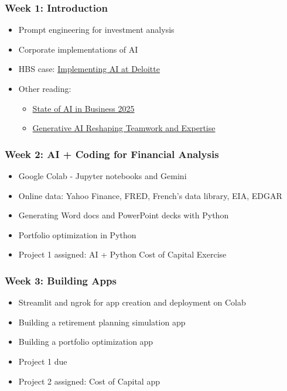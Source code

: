 \documentclass[11pt]{article}
\begin{document}
\subsubsection*{Week 1: Introduction}
\begin{itemize}\setlength{\itemsep}{0pt}
\item Prompt engineering for investment analysis
\item Corporate implementations of AI
\item HBS case: \href{https://hbsp.harvard.edu/product/HEC382-PDF-ENG}{Implementing AI at Deloitte}
\item Other reading: 
\begin{itemize}\setlength{\itemsep}{0pt}
\item\href{https://mlq.ai/media/quarterly_decks/v0.1_State_of_AI_in_Business_2025_Report.pdf}{State of AI in Business 2025}
\item \href{https://papers.ssrn.com/sol3/papers.cfm?abstract_id=5188231}{Generative AI Reshaping Teamwork and Expertise}
\end{itemize}
\end{itemize}





\subsubsection*{Week 2: AI + Coding for Financial Analysis}
\begin{itemize}\setlength{\itemsep}{0pt}
\item Google Colab - Jupyter notebooks and Gemini
\item Online data: Yahoo Finance, FRED, French's data library, EIA, EDGAR
\item Generating Word docs and PowerPoint decks with Python
\item Portfolio optimization in Python
\item Project 1 assigned: AI + Python Cost of Capital Exercise
\end{itemize}

\subsubsection*{Week 3: Building Apps}
\begin{itemize}\setlength{\itemsep}{0pt}
\item Streamlit and ngrok for app creation and deployment on Colab
\item Building a retirement planning simulation app
\item Building a portfolio optimization app
\item Project 1 due
\item Project 2 assigned: Cost of Capital app
\end{itemize}
\end{document}
